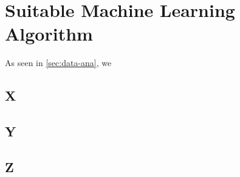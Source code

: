 \chapter{Suitable Machine Learning Algorithm}\label{sec:ml-algo}


As seen in \cref{sec:data-ana}, we

\section{X}

\section{Y}

\section{Z}

